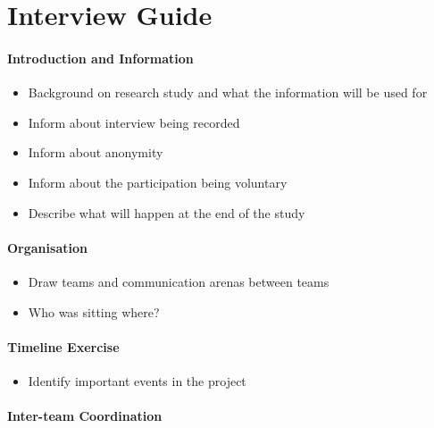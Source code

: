 \chapter{Interview Guide}


\subsubsection{Introduction and Information}

\begin{itemize}
	\item Background on research study and what the information will be used for
	\item Inform about interview being recorded
	\item Inform about anonymity
	\item Inform about the participation being voluntary
	\item Describe what will happen at the end of the study
\end{itemize}

\subsubsection{Organisation}

\begin{itemize}
	\item Draw teams and communication arenas between teams
	\item Who was sitting where?
\end{itemize}

\subsubsection{Timeline Exercise}

\begin{itemize}
	\item Identify important events in the project
\end{itemize}

\subsubsection{Inter-team Coordination}

